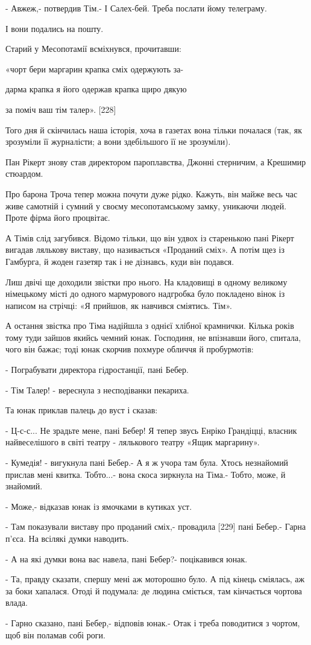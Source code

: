 - Авжеж,- потвердив Тім.- І Салех-бей. Треба послати йому телеграму.

І вони подались на пошту.

Старий у Месопотамії всміхнувся, прочитавши:

«чорт бери маргарин крапка сміх одержують за-

дарма крапка я його одержав крапка щиро дякую

за поміч ваш тім талер». [228]

Того дня й скінчилась наша історія, хоча в газетах вона тільки почалася (так, як зрозуміли її журналісти; а вони здебільшого її не зрозуміли).

Пан Рікерт знову став директором пароплавства, Джонні стерничим, а Крешимир стюардом.

Про барона Троча тепер можна почути дуже рідко. Кажуть, він майже весь час живе
самотній і сумний у своєму месопотамському замку, уникаючи людей. Проте фірма
його процвітає.

А Тімів слід загубився. Відомо тільки, що він удвох із старенькою пані Рікерт
вигадав лялькову виставу, що називається «Проданий сміх». А потім щез із
Гамбурга, й жоден газетяр так і не дізнавсь, куди він подався.

Лиш двічі ще доходили звістки про нього. На кладовищі в одному великому
німецькому місті до одного мармурового надгробка було покладено вінок із
написом на стрічці: «Я прийшов, як навчився сміятись. Тім».

А остання звістка про Тіма надійшла з однієї хлібної крамнички. Кілька років тому туди зайшов якийсь чемний юнак. Господиня, не впізнавши його, спитала, чого він бажає; тоді юнак скорчив похмуре обличчя й пробурмотів:

- Пограбувати директора гідростанції, пані Бебер.

- Тім Талер! - вереснула з несподіванки пекариха.

Та юнак приклав палець до вуст і сказав:

- Ц-с-с... Не зрадьте мене, пані Бебер! Я тепер звусь Енріко Грандіцці, власник найвеселішого в світі театру - лялькового театру «Ящик маргарину».

- Кумедія! - вигукнула пані Бебер.- А я ж учора там була. Хтось незнайомий прислав мені квитка. Тобто...- вона скоса зиркнула на Тіма.- Тобто, може, й знайомий.

- Може,- відказав юнак із ямочками в кутиках уст.

- Там показували виставу про проданий сміх,- провадила [229] пані Бебер.- Гарна п'єса. На всілякі думки наводить.

- А на які думки вона вас навела, пані Бебер?- поцікавився юнак.

- Та, правду сказати, спершу мені аж моторошно було. А під кінець сміялась, аж
за боки хапалася. Отоді й подумала: де людина сміється, там кінчається чортова
влада.

- Гарно сказано, пані Бебер,- відповів юнак.- Отак і треба поводитися з чортом, щоб він поламав собі роги.
